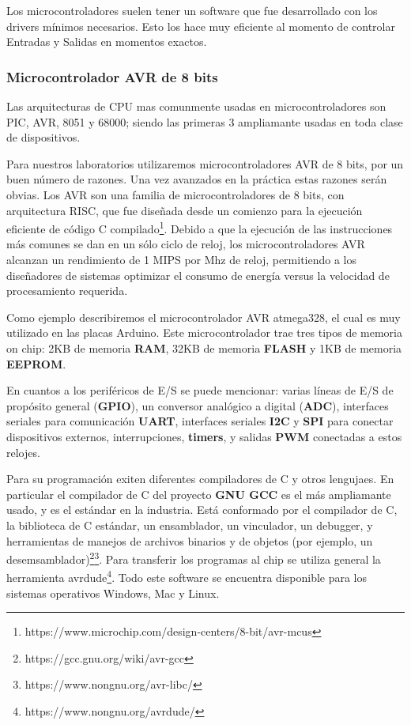 \documentclass[output=paper, 
colorlinks,
citecolor=brown,
newtxmath
]{langscibook}
\begin{document}
Los microcontroladores suelen tener un software que fue 
desarrollado con los drivers mínimos necesarios. Esto los hace
muy eficiente al momento de controlar Entradas y Salidas
en momentos exactos. 

\subsubsection{Microcontrolador AVR de 8 bits}

Las arquitecturas de CPU mas comunmente usadas en microcontroladores
son PIC, AVR, 8051 y 68000; siendo las primeras 3 ampliamante usadas
en toda clase de dispositivos.

Para nuestros laboratorios utilizaremos microcontroladores AVR de 8 bits,
por un buen número de razones. Una vez avanzados en la práctica
estas razones serán obvias. Los AVR son una familia de microcontroladores de 8 bits, con arquitectura
RISC, que fue diseñada desde un comienzo 
para la ejecución eficiente de código C compilado\footnote{https://www.microchip.com/design-centers/8-bit/avr-mcus}. Debido a que
la ejecución de las instrucciones más comunes se dan en un sólo
ciclo de reloj, los microcontroladores AVR alcanzan un rendimiento
de 1 MIPS por Mhz de reloj, permitiendo a los diseñadores de
sistemas optimizar el consumo de energía versus la velocidad
de procesamiento requerida.

Como ejemplo describiremos el microcontrolador AVR atmega328, 
el cual es muy utilizado en las placas
Arduino. Este microcontrolador trae tres tipos de memoria on chip: 2KB de memoria \textbf{RAM},
32KB de memoria \textbf{FLASH} y 1KB de memoria \textbf{EEPROM}.

En cuantos a los periféricos de E/S se puede mencionar:
varias líneas de E/S de propósito general (\textbf{GPIO}), un conversor
analógico a digital (\textbf{ADC}), interfaces seriales para comunicación 
\textbf{UART}, interfaces seriales \textbf{I2C} y \textbf{SPI} para conectar 
dispositivos externos, interrupciones, \textbf{timers}, y 
salidas \textbf{PWM} conectadas a estos relojes.

Para su programación exiten diferentes compiladores de C
y otros lengujaes. En particular el compilador de C
del proyecto \textbf{GNU GCC} es el más ampliamante usado,
y es el estándar en la industria. Está conformado
por el compilador de C, la biblioteca de C estándar,
un ensamblador, un vinculador, un debugger, y herramientas de 
manejos de archivos binarios y de objetos (por ejemplo,
un desemsamblador)\footnote{https://gcc.gnu.org/wiki/avr-gcc}\footnote{https://www.nongnu.org/avr-libc/}. Para transferir los programas al 
chip se utiliza general la herramienta avrdude\footnote{https://www.nongnu.org/avrdude/}.
Todo este software se encuentra disponible para los sistemas
operativos Windows, Mac y Linux.
\end{document}
